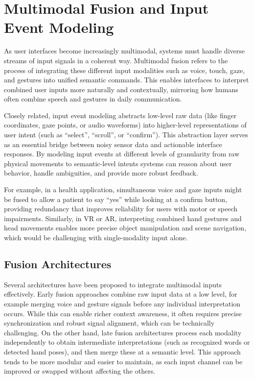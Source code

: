\documentclass[openany]{book}
\begin{document}
\section{Multimodal Fusion and Input Event Modeling}
As user interfaces become increasingly multimodal, systems must handle diverse streams of input signals in a coherent way. Multimodal fusion refers to the process of integrating these different input modalities such as voice, touch, gaze, and gestures into unified semantic commands.  This enables interfaces to interpret combined user inputs more naturally and contextually, mirroring how humans often combine speech and gestures in daily communication.

Closely related, input event modeling abstracts low-level raw data (like finger coordinates, gaze points, or audio waveforms) into higher-level representations of user intent (such as “select”, “scroll”, or “confirm”). This abstraction layer serves as an essential bridge between noisy sensor data and actionable interface responses. By modeling input events at different levels of granularity from raw physical movements to semantic-level intents systems can reason about user behavior, handle ambiguities, and provide more robust feedback.

For example, in a health application, simultaneous voice and gaze inputs might be fused to allow a patient to say “yes” while looking at a confirm button, providing redundancy that improves reliability for users with motor or speech impairments. Similarly, in VR or AR, interpreting combined hand gestures and head movements enables more precise object manipulation and scene navigation, which would be challenging with single-modality input alone.

\subsection{Fusion Architectures}
Several architectures have been proposed to integrate multimodal inputs effectively. Early fusion approaches combine raw input data at a low level, for example merging voice and gesture signals before any individual interpretation occurs. While this can enable richer context awareness, it often requires precise synchronization and robust signal alignment, which can be technically challenging.
On the other hand, late fusion architectures process each modality independently to obtain intermediate interpretations (such as recognized words or detected hand poses), and then merge these at a semantic level. This approach tends to be more modular and easier to maintain, as each input channel can be improved or swapped without affecting the others.
\end{document}
